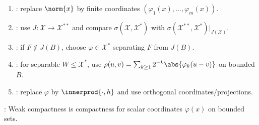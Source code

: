 \begin{method} \label{meth:weak-compactness-proof-patterns} 
\begin{enumerate}[label=(\roman*)]
\setlength{\itemsep}{0pt}
\item {}: replace $\norm{x}$ by finite coordinates $(\varphi_1(x),\ldots,\varphi_m(x))$.
\item {}: use $J:\mathcal{X}\to\mathcal{X}^{**}$ and compare $\sigma(\mathcal{X},\mathcal{X}^*)$ with $\sigma(\mathcal{X}^{**},\mathcal{X}^*)|_{J(\mathcal{X})}$.
\item {}: if $F\notin J(B)$, choose $\varphi\in\mathcal{X}^*$ separating $F$ from $J(B)$.
\item {}: for separable $W\leq\mathcal{X}^*$, use $\rho(u,v)=\sum_{k\geq1}2^{-k}\abs{\varphi_k(u-v)}$ on bounded $B$.
\item {}: replace $\varphi$ by $\innerprod{\cdot,h}$ and use orthogonal coordinates/projections.
\end{enumerate}
: Weak compactness is compactness for scalar coordinates $\varphi(x)$ on bounded sets.
\end{method}
